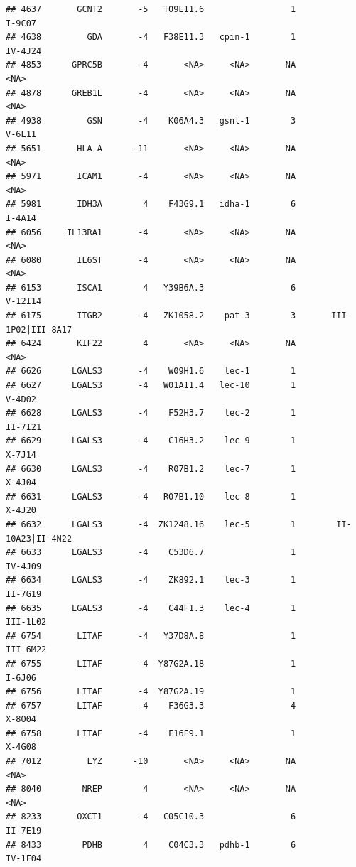 \documentclass[
]{article}
\begin{document}
\begin{verbatim}
## 4637       GCNT2       -5   T09E11.6                 1                  I-9C07
## 4638         GDA       -4   F38E11.3   cpin-1        1                 IV-4J24
## 4853      GPRC5B       -4       <NA>     <NA>       NA                    <NA>
## 4878      GREB1L       -4       <NA>     <NA>       NA                    <NA>
## 4938         GSN       -4    K06A4.3   gsnl-1        3                  V-6L11
## 5651       HLA-A      -11       <NA>     <NA>       NA                    <NA>
## 5971       ICAM1       -4       <NA>     <NA>       NA                    <NA>
## 5981       IDH3A        4    F43G9.1   idha-1        6                  I-4A14
## 6056     IL13RA1       -4       <NA>     <NA>       NA                    <NA>
## 6080       IL6ST       -4       <NA>     <NA>       NA                    <NA>
## 6153       ISCA1        4   Y39B6A.3                 6                 V-12I14
## 6175       ITGB2       -4   ZK1058.2    pat-3        3       III-1P02|III-8A17
## 6424       KIF22        4       <NA>     <NA>       NA                    <NA>
## 6626      LGALS3       -4    W09H1.6    lec-1        1                        
## 6627      LGALS3       -4   W01A11.4   lec-10        1                  V-4D02
## 6628      LGALS3       -4    F52H3.7    lec-2        1                 II-7I21
## 6629      LGALS3       -4    C16H3.2    lec-9        1                  X-7J14
## 6630      LGALS3       -4    R07B1.2    lec-7        1                  X-4J04
## 6631      LGALS3       -4   R07B1.10    lec-8        1                  X-4J20
## 6632      LGALS3       -4  ZK1248.16    lec-5        1        II-10A23|II-4N22
## 6633      LGALS3       -4    C53D6.7                 1                 IV-4J09
## 6634      LGALS3       -4    ZK892.1    lec-3        1                 II-7G19
## 6635      LGALS3       -4    C44F1.3    lec-4        1                III-1L02
## 6754       LITAF       -4   Y37D8A.8                 1                III-6M22
## 6755       LITAF       -4  Y87G2A.18                 1                  I-6J06
## 6756       LITAF       -4  Y87G2A.19                 1                        
## 6757       LITAF       -4    F36G3.3                 4                  X-8O04
## 6758       LITAF       -4    F16F9.1                 1                  X-4G08
## 7012         LYZ      -10       <NA>     <NA>       NA                    <NA>
## 8040        NREP        4       <NA>     <NA>       NA                    <NA>
## 8233       OXCT1       -4   C05C10.3                 6                 II-7E19
## 8433        PDHB        4    C04C3.3   pdhb-1        6                 IV-1F04

\end{verbatim}
\end{document}
